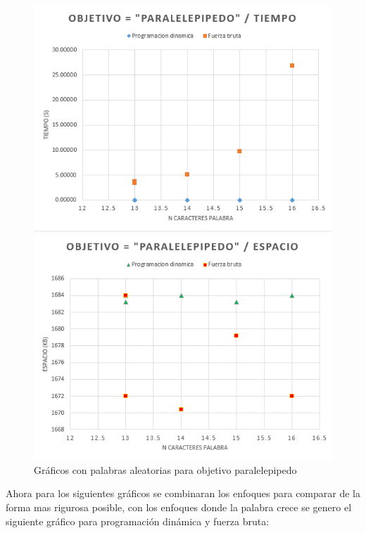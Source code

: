 \begin{figure}[H]
    \centering
    \begin{minipage}[t]{0.5\textwidth}
        \includegraphics[width=\textwidth]{images/palabras-generadasT.png}
    \end{minipage}%
    \begin{minipage}[t]{0.5\textwidth}
        \includegraphics[width=\textwidth]{images/palabras-generadasE.png}    \end{minipage}%
    \caption{Gráficos con palabras aleatorias para objetivo paralelepipedo}
    \label{fig:random}
\end{figure} 

Ahora para los siguientes gráficos se combinaran los enfoques para comparar de la forma mas rigurosa posible, con los enfoques donde la palabra crece se genero el siguiente gráfico para programación dinámica y fuerza bruta:


